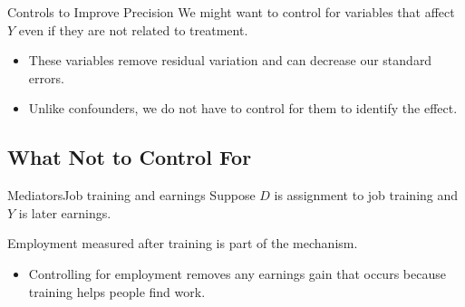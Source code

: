 \documentclass[aspectratio=169,t,11pt,table]{beamer}
\begin{document}
\begin{frame}{Controls to Improve Precision}
  We might want to control for variables that affect $Y$ even if they are not related to treatment.
  \begin{itemize}
    \item These variables remove residual variation and can decrease our standard errors.
    \item Unlike confounders, we do not have to control for them to identify the effect.
  \end{itemize}

  \bigskip
  \begin{center}

  \end{center}
\end{frame}

\subsection{What Not to Control For}

\begin{frame}{Mediators}{Job training and earnings}
  Suppose $D$ is assignment to job training and $Y$ is later earnings.

  \bigskip
  \begin{center}
  \end{center}

  \pause
  \bigskip
  Employment measured after training is part of the mechanism.
  \begin{itemize}
    \item Controlling for employment removes any earnings gain that occurs because training helps people find work.
  \end{itemize}
\end{frame}
\end{document}
